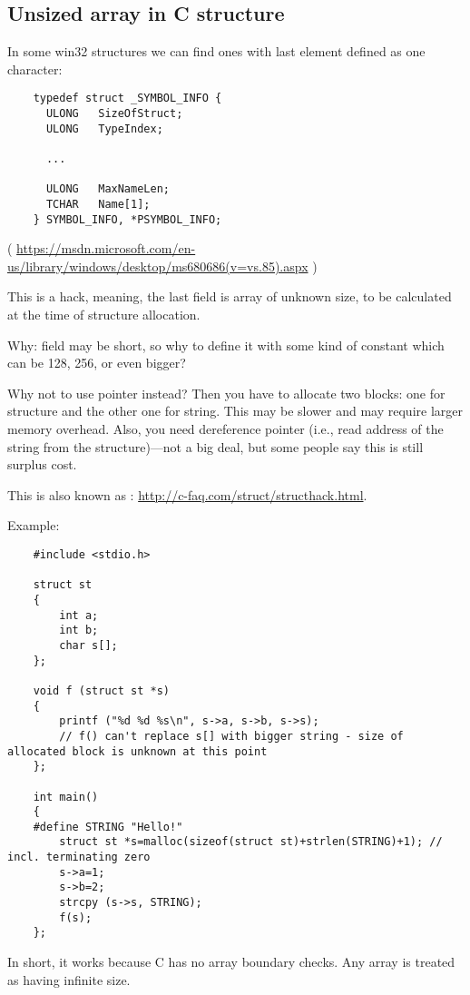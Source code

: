 \subsection{Unsized array in C structure}

In some win32 structures we can find ones with last element defined as one character:

\begin{lstlisting}
	typedef struct _SYMBOL_INFO {
	  ULONG   SizeOfStruct;
	  ULONG   TypeIndex;
	  
	  ...
	
	  ULONG   MaxNameLen;
	  TCHAR   Name[1];
	} SYMBOL_INFO, *PSYMBOL_INFO;
\end{lstlisting}

( \url{https://msdn.microsoft.com/en-us/library/windows/desktop/ms680686(v=vs.85).aspx} )

This is a hack, meaning, the last field is array of unknown size, to be calculated at the time of structure allocation.

Why:  field may be short, so why to define it with some kind of 
constant which can be 128, 256, or even bigger?

Why not to use pointer instead? Then you have to allocate two blocks: one for structure and the other one for string.
This may be slower and may require larger memory overhead.
Also, you need dereference pointer (i.e., read address of the string from the structure)---not a big deal, but some
people say this is still surplus cost.

This is also known as : \url{http://c-faq.com/struct/structhack.html}.

Example:

\begin{lstlisting}
	#include <stdio.h>

	struct st
	{
		int a;
		int b;
		char s[];
	};

	void f (struct st *s)
	{
		printf ("%d %d %s\n", s->a, s->b, s->s);
		// f() can't replace s[] with bigger string - size of allocated block is unknown at this point
	};

	int main()
	{
	#define STRING "Hello!"
		struct st *s=malloc(sizeof(struct st)+strlen(STRING)+1); // incl. terminating zero
		s->a=1;
		s->b=2;
		strcpy (s->s, STRING);
		f(s);
	};
\end{lstlisting}

In short, it works because C has no array boundary checks. Any array is treated as having infinite size.

